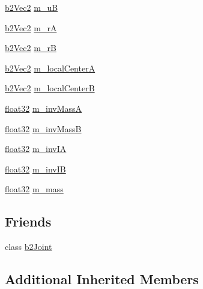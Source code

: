 \begin{DoxyCompactItemize}
\item 
\mbox{\hyperlink{structb2_vec2}{b2\+Vec2}} \mbox{\hyperlink{classb2_pulley_joint_a1354dfebc4658560b9d7e4b447b1dd5e}{m\+\_\+uB}}
\item 
\mbox{\hyperlink{structb2_vec2}{b2\+Vec2}} \mbox{\hyperlink{classb2_pulley_joint_a4ebd669d4856b0c6d1d6f76d7a9eae2d}{m\+\_\+rA}}
\item 
\mbox{\hyperlink{structb2_vec2}{b2\+Vec2}} \mbox{\hyperlink{classb2_pulley_joint_a6be5e9ad2eeaee5cf25e1df61d923a58}{m\+\_\+rB}}
\item 
\mbox{\hyperlink{structb2_vec2}{b2\+Vec2}} \mbox{\hyperlink{classb2_pulley_joint_a82741929b0aa083f520a3d7f9ef675bb}{m\+\_\+local\+CenterA}}
\item 
\mbox{\hyperlink{structb2_vec2}{b2\+Vec2}} \mbox{\hyperlink{classb2_pulley_joint_abd382cd6772fa3be1958c4845369f6c3}{m\+\_\+local\+CenterB}}
\item 
\mbox{\hyperlink{b2_settings_8h_aacdc525d6f7bddb3ae95d5c311bd06a1}{float32}} \mbox{\hyperlink{classb2_pulley_joint_a7c37029c6b7117a07bb8be552b44ee3f}{m\+\_\+inv\+MassA}}
\item 
\mbox{\hyperlink{b2_settings_8h_aacdc525d6f7bddb3ae95d5c311bd06a1}{float32}} \mbox{\hyperlink{classb2_pulley_joint_ad4e470cbc2e9f596c93e144630657534}{m\+\_\+inv\+MassB}}
\item 
\mbox{\hyperlink{b2_settings_8h_aacdc525d6f7bddb3ae95d5c311bd06a1}{float32}} \mbox{\hyperlink{classb2_pulley_joint_a701fbc685109f5b397b968be2407b123}{m\+\_\+inv\+IA}}
\item 
\mbox{\hyperlink{b2_settings_8h_aacdc525d6f7bddb3ae95d5c311bd06a1}{float32}} \mbox{\hyperlink{classb2_pulley_joint_a19278e2f7dcec7275aff55b1d760b398}{m\+\_\+inv\+IB}}
\item 
\mbox{\hyperlink{b2_settings_8h_aacdc525d6f7bddb3ae95d5c311bd06a1}{float32}} \mbox{\hyperlink{classb2_pulley_joint_a60efdc42d9fd8f4c50f96eb68ff3f191}{m\+\_\+mass}}
\end{DoxyCompactItemize}
\subsection*{Friends}
\begin{DoxyCompactItemize}
\item 
class \mbox{\hyperlink{classb2_pulley_joint_a54ade8ed3d794298108d7f4c4e4793fa}{b2\+Joint}}
\end{DoxyCompactItemize}
\subsection*{Additional Inherited Members}


